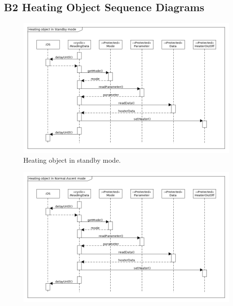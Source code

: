 \documentclass[a4paper,12pt,twoside]{article}
\providecommand{\DIFaddbeginFL}{} %
\providecommand{\DIFaddendFL}{} %
\providecommand{\DIFdelbeginFL}{} %
\providecommand{\DIFdelendFL}{} %
\newcommand{\DIFscaledelfig}{0.5}
\newlength{\DIFdelgraphicswidth} %
\newlength{\DIFdelgraphicsheight} %
\newcommand{\DIFaddincludegraphics}[2][]{{\color{blue}\fbox{\DIFOincludegraphics[#1]{#2}}}} %
\newcommand{\DIFdelincludegraphics}[2][]{%
\sbox{\DIFdelgraphicsbox}{\DIFOincludegraphics[#1]{#2}}%
\settoboxwidth{\DIFdelgraphicswidth}{\DIFdelgraphicsbox} %
\settoboxtotalheight{\DIFdelgraphicsheight}{\DIFdelgraphicsbox} %
\scalebox{\DIFscaledelfig}{%
\parbox[b]{\DIFdelgraphicswidth}{\usebox{\DIFdelgraphicsbox}\\[-\baselineskip] \rule{\DIFdelgraphicswidth}{0em}}\llap{\resizebox{\DIFdelgraphicswidth}{\DIFdelgraphicsheight}{%
\setlength{\unitlength}{\DIFdelgraphicswidth}%
\begin{picture}(1,1)%
\thicklines\linethickness{2pt} %
{\color[rgb]{1,0,0}\put(0,0){\framebox(1,1){}}}%
{\color[rgb]{1,0,0}\put(0,0){\line( 1,1){1}}}%
{\color[rgb]{1,0,0}\put(0,1){\line(1,-1){1}}}%
\end{picture}%
}\hspace*{3pt}}} %
} %
\DeclareRobustCommand{\DIFaddbeginFL}{\DIFOaddbeginFL \let\includegraphics\DIFaddincludegraphics} %
\DeclareRobustCommand{\DIFaddendFL}{\DIFOaddendFL \let\includegraphics\DIFOincludegraphics} %
\DeclareRobustCommand{\DIFdelbeginFL}{\DIFOdelbeginFL \let\includegraphics\DIFdelincludegraphics} %
\DeclareRobustCommand{\DIFdelendFL}{\DIFOaddendFL \let\includegraphics\DIFOincludegraphics} %
\begin{document}
\begin{landscape}
\subsection*{B2 Heating Object Sequence Diagrams}
\begin{figure}[H]
    \centering
    \DIFdelbeginFL %
\DIFdelendFL \DIFaddbeginFL \includegraphics[height=0.9\textwidth]{appendix/img/heater-seq-dia-a.png}
    \DIFaddendFL \caption{Heating object in standby mode.}
    \label{heatera}
\end{figure}
\begin{figure}[H]
    \centering
    \DIFdelbeginFL %
\DIFdelendFL \DIFaddbeginFL \includegraphics[height=0.9\textwidth]{appendix/img/heater-seq-dia-b.png}

\end{figure}
\end{landscape}
\end{document}
